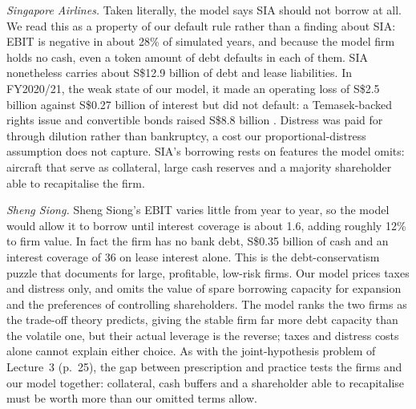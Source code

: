 \textit{Singapore Airlines.} Taken literally, the model says SIA should not borrow at all. We read this as a property of our default rule rather than a finding about SIA: EBIT is negative in about 28\% of simulated years, and because the model firm holds no cash, even a token amount of debt defaults in each of them. SIA nonetheless carries about S\$12.9 billion of debt and lease liabilities. In FY2020/21, the weak state of our model, it made an operating loss of S\$2.5 billion against S\$0.27 billion of interest but did not default: a Temasek-backed rights issue and convertible bonds raised S\$8.8 billion \citetext{\citealp{sia2020}; details in Appendix~\ref{app:E}}. Distress was paid for through dilution rather than bankruptcy, a cost our proportional-distress assumption does not capture. SIA's borrowing rests on features the model omits: aircraft that serve as collateral, large cash reserves and a majority shareholder able to recapitalise the firm.

\textit{Sheng Siong.} Sheng Siong's EBIT varies little from year to year, so the model would allow it to borrow until interest coverage is about 1.6, adding roughly 12\% to firm value. In fact the firm has no bank debt, S\$0.35 billion of cash and an interest coverage of 36 on lease interest alone. This is the debt-conservatism puzzle that \citet{graham2000} documents for large, profitable, low-risk firms. Our model prices taxes and distress only, and omits the value of spare borrowing capacity for expansion and the preferences of controlling shareholders. The model ranks the two firms as the trade-off theory predicts, giving the stable firm far more debt capacity than the volatile one, but their actual leverage is the reverse; taxes and distress costs alone cannot explain either choice. As with the joint-hypothesis problem of Lecture~3 (p.~25), the gap between prescription and practice tests the firms and our model together: collateral, cash buffers and a shareholder able to recapitalise must be worth more than our omitted terms allow.
